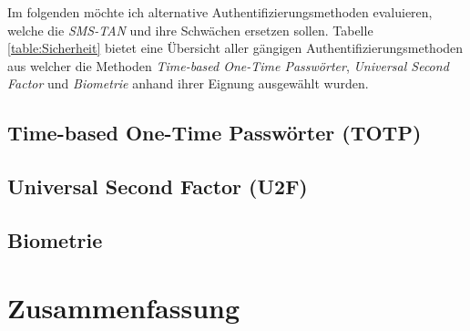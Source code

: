 \documentclass[11pt,a4paper,ngerman]{scrreprt}
\begin{document}
Im folgenden möchte ich alternative Authentifizierungsmethoden evaluieren, welche die \textit{SMS-TAN} und ihre Schwächen ersetzen sollen. Tabelle \ref{table:Sicherheit} bietet eine Übersicht aller gängigen Authentifizierungsmethoden aus welcher die Methoden \textit{Time-based One-Time Passwörter}, \textit{Universal Second Factor} und \textit{Biometrie} anhand ihrer Eignung ausgewählt wurden.
\section{Time-based One-Time Passwörter (TOTP)}
\section{Universal Second Factor (U2F)}
\section{Biometrie}

\chapter{Zusammenfassung}


\end{document}
